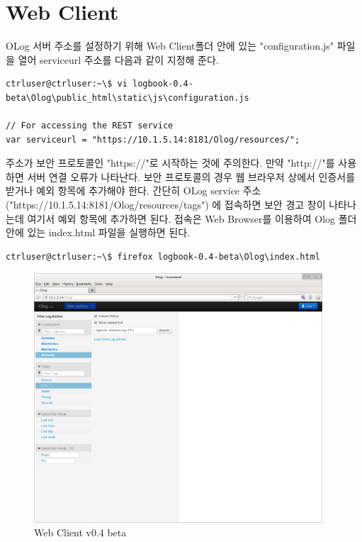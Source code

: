\documentclass[11pt
  , a4paper
  , article
  , oneside
]{memoir}
\begin{document}
\section{Web Client}
OLog 서버 주소를 설정하기 위해 Web Client폴더 안에 있는
"configuration.js" 파일을 열어 serviceurl 주소를 다음과 같이 지정해 준다.
\begin{lstlisting}[style=termstyle]
ctrluser@ctrluser:~\$ vi logbook-0.4-beta\Olog\public_html\static\js\configuration.js

// For accessing the REST service
var serviceurl = "https://10.1.5.14:8181/Olog/resources/";
\end{lstlisting}
주소가 보안 프로토콜인  "https://"로 시작하는 것에 주의한다. 만약 "http://"를 사용하면
서버 연결 오류가 나타난다. 보안 프로토콜의 경우 웹 브라우저 상에서 인증서를 받거나 
예외 항목에 추가해야 한다. 간단히 OLog service 주소("https://10.1.5.14:8181/Olog/resources/tags")
에 접속하면 보안 경고 창이 나타나는데 여기서 예외 항목에 추가하면 된다.
접속은 Web Browser를 이용하여 Olog 폴더안에 있는 index.html 파일을 실행하면 된다.

\begin{lstlisting}[style=termstyle]
ctrluser@ctrluser:~\$ firefox logbook-0.4-beta\Olog\index.html
\end{lstlisting}

\begin{figure}[!htb]
  \centering
  \includegraphics[width=0.96\textwidth]{./images/Web_Client.png}
  \caption{
            Web Client v0.4 beta
          }
  \label{fig:web_client}
\end{figure}
\end{document}
